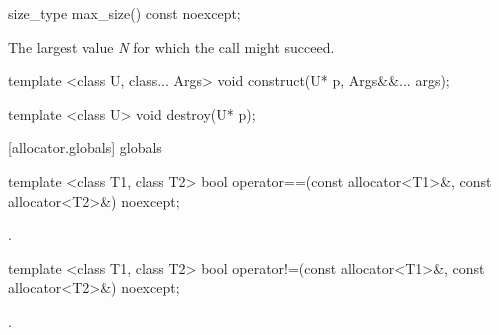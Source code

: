 \begin{itemdecl}
size_type max_size() const noexcept;
\end{itemdecl}

\begin{itemdescr}
\pnum
\returns
The largest value \textit{N} for which the call 
might succeed.
\end{itemdescr}

%
\begin{itemdecl}
template <class U, class... Args>
  void construct(U* p, Args&&... args);
\end{itemdecl}

\begin{itemdescr}
\pnum
\effects
{}
\end{itemdescr}

%
\begin{itemdecl}
template <class U>
  void destroy(U* p);
\end{itemdecl}

\begin{itemdescr}
\pnum
\effects
{}
\end{itemdescr}

[allocator.globals]{ globals}

%
%
\begin{itemdecl}
template <class T1, class T2>
  bool operator==(const allocator<T1>&, const allocator<T2>&) noexcept;
\end{itemdecl}

\begin{itemdescr}
\pnum
\returns
{}.
\end{itemdescr}

%
%
\begin{itemdecl}
template <class T1, class T2>
  bool operator!=(const allocator<T1>&, const allocator<T2>&) noexcept;
\end{itemdecl}

\begin{itemdescr}
\pnum
\returns
{}.
\end{itemdescr}

